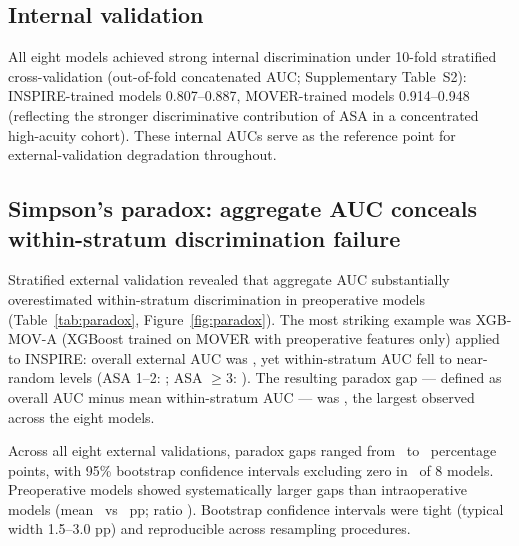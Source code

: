 \subsection{Internal validation}
\label{sec:results:internal}

All eight models achieved strong internal discrimination under 10-fold stratified cross-validation (out-of-fold concatenated AUC; Supplementary Table~S2): INSPIRE-trained models 0.807--0.887, MOVER-trained models 0.914--0.948 (reflecting the stronger discriminative contribution of ASA in a concentrated high-acuity cohort). These internal AUCs serve as the reference point for external-validation degradation throughout.

\subsection{Simpson's paradox: aggregate AUC conceals within-stratum discrimination failure}
\label{sec:results:paradox}

Stratified external validation revealed that aggregate AUC substantially overestimated within-stratum discrimination in preoperative models (Table~\ref{tab:paradox}, Figure~\ref{fig:paradox}). The most striking example was XGB-MOV-A (XGBoost trained on MOVER with preoperative features only) applied to INSPIRE: overall external AUC was \pnXgbMovAAucFull, yet within-stratum AUC fell to near-random levels (ASA 1--2: \pnXgbMovAAsaOneTwoAuc; ASA $\geq 3$: \pnXgbMovAAsaThreeAuc). The resulting paradox gap --- defined as overall AUC minus mean within-stratum AUC --- was \pnParadoxGapXgbMovAOnInspireFull, the largest observed across the eight models.

Across all eight external validations, paradox gaps ranged from \pnParadoxGapMin\ to \pnParadoxGapMax\ percentage points, with 95\% bootstrap confidence intervals excluding zero in \pnParadoxGapsSignificant\ of 8 models. Preoperative models showed systematically larger gaps than intraoperative models (mean \pnMeanParadoxGapPreop\ vs \pnMeanParadoxGapIntraop~pp; ratio \pnParadoxGapRatio). Bootstrap confidence intervals were tight (typical width 1.5--3.0 pp) and reproducible across resampling procedures.

